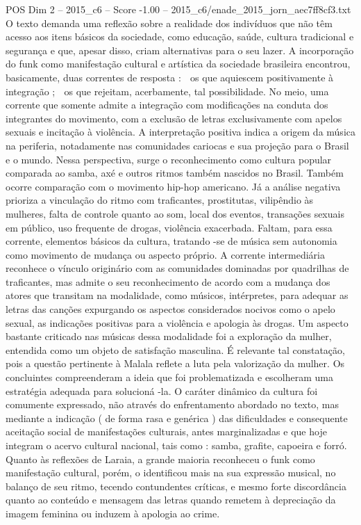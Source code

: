 \begin{textsample}{POS Dim 2 – 2015\_c6 – Score -1.00 – 2015\_c6/enade\_2015\_jorn\_aec7ff8cf3.txt}
O texto demanda uma reflexão sobre a realidade dos indivíduos que não têm acesso aos itens básicos da sociedade, como educação, saúde, cultura tradicional e segurança e que, apesar disso, criam alternativas para o seu lazer.
A incorporação do funk como manifestação cultural e artística da sociedade brasileira encontrou, basicamente, duas correntes de resposta :  os que aquiescem positivamente à integração ;  os que rejeitam, acerbamente, tal possibilidade.
No meio, uma corrente que somente admite a integração com modificações na conduta dos integrantes do movimento, com a exclusão de letras exclusivamente com apelos sexuais e incitação à violência.
A interpretação positiva indica a origem da música na periferia, notadamente nas comunidades cariocas e sua projeção para o Brasil e o mundo.
Nessa perspectiva, surge o reconhecimento como cultura popular comparada ao samba, axé e outros ritmos também nascidos no Brasil.
Também ocorre comparação com o movimento hip-hop americano.
Já a análise negativa prioriza a vinculação do ritmo com traficantes, prostitutas, vilipêndio às mulheres, falta de controle quanto ao som, local dos eventos, transações sexuais em público, uso frequente de drogas, violência exacerbada.
Faltam, para essa corrente, elementos básicos da cultura, tratando -se de música sem autonomia como movimento de mudança ou aspecto próprio.
A corrente intermediária reconhece o vínculo originário com as comunidades dominadas por quadrilhas de traficantes, mas admite o seu reconhecimento de acordo com a mudança dos atores que transitam na modalidade, como músicos, intérpretes, para adequar as letras das canções expurgando os aspectos considerados nocivos como o apelo sexual, as indicações positivas para a violência e apologia às drogas.
Um aspecto bastante criticado nas músicas dessa modalidade foi a exploração da mulher, entendida como um objeto de satisfação masculina.
É relevante tal constatação, pois a questão pertinente à Malala reflete a luta pela valorização da mulher.
Os concluintes compreenderam a ideia que foi problematizada e escolheram uma estratégia adequada para solucioná -la.
O caráter dinâmico da cultura foi comumente expressado, não através do enfrentamento abordado no texto, mas mediante a indicação ( de forma rasa e genérica ) das dificuldades e consequente aceitação social de manifestações culturais, antes marginalizadas e que hoje integram o acervo cultural nacional, tais como : samba, grafite, capoeira e forró.
Quanto às reflexões de Laraia, a grande maioria reconheceu o funk como manifestação cultural, porém, o identificou mais na sua expressão musical, no balanço de seu ritmo, tecendo contundentes críticas, e mesmo forte discordância quanto ao conteúdo e mensagem das letras quando remetem à depreciação da imagem feminina ou induzem à apologia ao crime.

\end{textsample}
